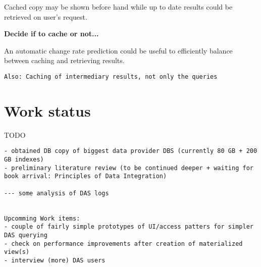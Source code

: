 \documentclass[a4paper,11pt,draft]{article}
\begin{document}
Cached copy may be shown before hand while up to date results could be retrieved on user's request.

\textbf{Decide if to cache or not...}


An automatic change rate prediction could be useful to efficiently balance between caching and retrieving results.

\begin{verbatim}
Also: Caching of intermediary results, not only the queries
\end{verbatim}

\section{Work status}
TODO

\begin{verbatim}
- obtained DB copy of biggest data provider DBS (currently 80 GB + 200 GB indexes)
- preliminary literature review (to be continued deeper + waiting for book arrival: Principles of Data Integration)

--- some analysis of DAS logs


Upcomming Work items:
- couple of fairly simple prototypes of UI/access patters for simpler DAS querying
- check on performance improvements after creation of materialized view(s)
- interview (more) DAS users
\end{verbatim}



\thispagestyle{empty}

\end{document}
